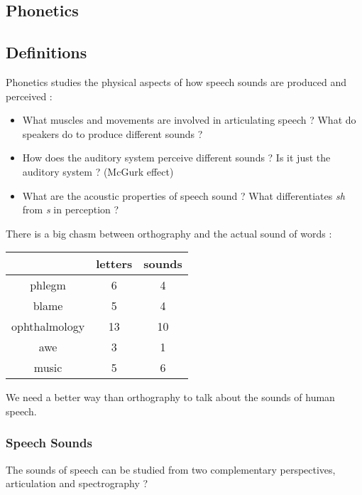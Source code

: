 \documentclass{cours}
\begin{document}
\subsection{Phonetics}
\subsection{Definitions}
Phonetics studies the physical aspects of how speech sounds are produced and perceived\! :
\begin{itemize}
    \item What muscles and movements are involved in articulating speech ?  What do speakers do to produce different sounds ?
    \item How does the auditory system perceive different sounds ? Is it just the auditory system ? (McGurk effect)
    \item What are the acoustic properties of speech sound ? What differentiates \textsl{sh} from \textsl{s} in perception ?
\end{itemize}

There is a big chasm between orthography and the actual sound of words\! :
\begin{center}
    \begin{tabular}{ccc}
        \toprule
                      & letters & sounds \\
        \midrule
        phlegm        & 6       & 4      \\
        blame         & 5       & 4      \\
        ophthalmology & 13      & 10     \\
        awe           & 3       & 1      \\
        music         & 5       & 6      \\
        \bottomrule
    \end{tabular}
\end{center}
We need a better way than orthography to talk about the sounds of human speech.

\subsubsection{Speech Sounds}
The sounds of speech can be studied from two complementary perspectives, articulation and spectrography ? %
\end{document}
